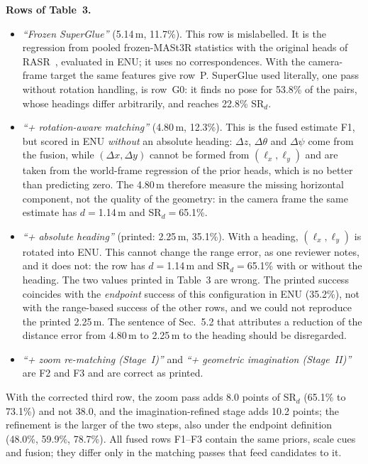 \documentclass[10pt,twocolumn,letterpaper]{article}
\newcommand{\dth}{\Delta\theta}
\newcommand{\dpsi}{\Delta\psi}
\newcommand{\SRd}{SR$_{d}$}
\begin{document}
\noindent\textbf{Rows of Table~3.}
\begin{itemize}[leftmargin=*,itemsep=1pt,topsep=2pt]
\item \emph{``Frozen SuperGlue''} (5.14\,m, 11.7\%). This row is mislabelled. It is the regression from pooled frozen-MASt3R statistics with the original heads of RASR~\cite{liang2026rasr}, evaluated in ENU; it uses no correspondences. With the camera-frame target the same features give row~P. SuperGlue used literally, one pass without rotation handling, is row~G0: it finds no pose for 53.8\% of the pairs, whose headings differ arbitrarily, and reaches 22.8\% \SRd.
\item \emph{``+ rotation-aware matching''} (4.80\,m, 12.3\%). This is the fused estimate F1, but scored in ENU \emph{without} an absolute heading: $\Delta z$, $\dth$ and $\dpsi$ come from the fusion, while $(\Delta x,\Delta y)$ cannot be formed from $(\ell_x,\ell_y)$ and are taken from the world-frame regression of the prior heads, which is no better than predicting zero. The 4.80\,m therefore measure the missing horizontal component, not the quality of the geometry: in the camera frame the same estimate has $d{=}$1.14\,m and \SRd{}${=}$65.1\%.
\item \emph{``+ absolute heading''} (printed: 2.25\,m, 35.1\%). With a heading, $(\ell_x,\ell_y)$ is rotated into ENU. This cannot change the range error, as one reviewer notes, and it does not: the row has $d{=}$1.14\,m and \SRd{}${=}$65.1\% with or without the heading. The two values printed in Table~3 are wrong. The printed success coincides with the \emph{endpoint} success of this configuration in ENU (35.2\%), not with the range-based success of the other rows, and we could not reproduce the printed 2.25\,m. The sentence of Sec.~5.2 that attributes a reduction of the distance error from 4.80\,m to 2.25\,m to the heading should be disregarded.
\item \emph{``+ zoom re-matching (Stage~I)''} and \emph{``+ geometric imagination (Stage~II)''} are F2 and F3 and are correct as printed.
\end{itemize}
With the corrected third row, the zoom pass adds 8.0 points of \SRd{} (65.1\% to 73.1\%) and not 38.0, and the imagination-refined stage adds 10.2 points; the refinement is the larger of the two steps, also under the endpoint definition (48.0\%, 59.9\%, 78.7\%). All fused rows F1--F3 contain the same priors, scale cues and fusion; they differ only in the matching passes that feed candidates to it.
\end{document}
